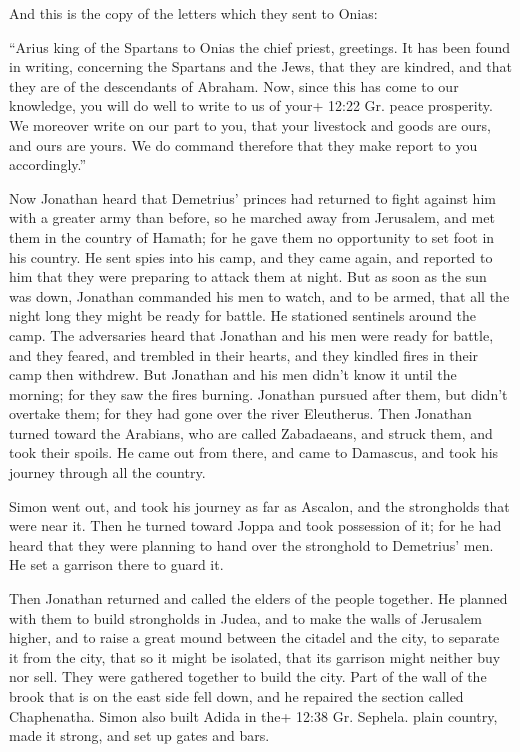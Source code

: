  And this is the copy of the letters which they sent to
Onias:

 ``Arius king of the Spartans to Onias the chief priest,
greetings.  It has been found in writing, concerning the
Spartans and the Jews, that they are kindred, and that they are of the
descendants of Abraham.  Now, since this has come to our
knowledge, you will do well to write to us of your+ 12:22 Gr. peace
prosperity.  We moreover write on our part to you, that
your livestock and goods are ours, and ours are yours. We do command
therefore that they make report to you accordingly.''

 Now Jonathan heard that Demetrius' princes had returned to
fight against him with a greater army than before,  so he
marched away from Jerusalem, and met them in the country of Hamath; for
he gave them no opportunity to set foot in his country.  He
sent spies into his camp, and they came again, and reported to him that
they were preparing to attack them at night.  But as soon
as the sun was down, Jonathan commanded his men to watch, and to be
armed, that all the night long they might be ready for battle. He
stationed sentinels around the camp.  The adversaries heard
that Jonathan and his men were ready for battle, and they feared, and
trembled in their hearts, and they kindled fires in their camp then
withdrew.  But Jonathan and his men didn't know it until
the morning; for they saw the fires burning.  Jonathan
pursued after them, but didn't overtake them; for they had gone over the
river Eleutherus.  Then Jonathan turned toward the
Arabians, who are called Zabadaeans, and struck them, and took their
spoils.  He came out from there, and came to Damascus, and
took his journey through all the country.

 Simon went out, and took his journey as far as Ascalon,
and the strongholds that were near it. Then he turned toward Joppa and
took possession of it;  for he had heard that they were
planning to hand over the stronghold to Demetrius' men. He set a
garrison there to guard it.

 Then Jonathan returned and called the elders of the people
together. He planned with them to build strongholds in Judea,
 and to make the walls of Jerusalem higher, and to raise a
great mound between the citadel and the city, to separate it from the
city, that so it might be isolated, that its garrison might neither buy
nor sell.  They were gathered together to build the city.
Part of the wall of the brook that is on the east side fell down, and he
repaired the section called Chaphenatha.  Simon also built
Adida in the+ 12:38 Gr. Sephela. plain country, made it strong, and set
up gates and bars.

